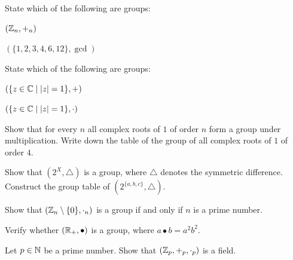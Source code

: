 \begin{exercise}
State which of the following are groups:
\begin{enumerate*}[label=\alph*), itemjoin={\qquad}]
\item $(\mathbb{Z}_n, +_n)$
\item $(\{1,2,3,4,6,12\}, \gcd)$
\end{enumerate*}
\end{exercise}

\begin{exercise}
State which of the following are groups:
\begin{enumerate*}[label=\alph*), itemjoin={\qquad}]
\item $(\{z\in\mathbb{C} \mid |z|=1\}, +)$
\item $(\{z\in\mathbb{C} \mid |z|=1\}, \cdot)$
\end{enumerate*}
\end{exercise}

\begin{exercise}
Show that for every $n$ all complex roots of $1$ of order $n$ form a group under multiplication. Write
down the table of the group of all complex roots of $1$ of order $4$.
\end{exercise}

\begin{exercise}
Show that $(2^X, \bigtriangleup)$ is a group, where $\bigtriangleup$ denotes the symmetric difference.
Construct the group table of $(2^{\{a,b,c\}}, \bigtriangleup)$.
\end{exercise}

\begin{exercise}
Show that $(\mathbb{Z}_n\setminus\{0\}, \cdot_n)$ is a group if and only if $n$ is a prime number.
\end{exercise}

\begin{exercise}
Verify whether $(\mathbb{R}_+, \bullet)$ is a group, where $a\bullet b = a^2 b^2$.
\end{exercise}

\begin{exercise}
Let $p\in\mathbb{N}$ be a prime number. Show that $(\mathbb{Z}_p, +_p, \cdot_p)$ is a field.
\end{exercise}

